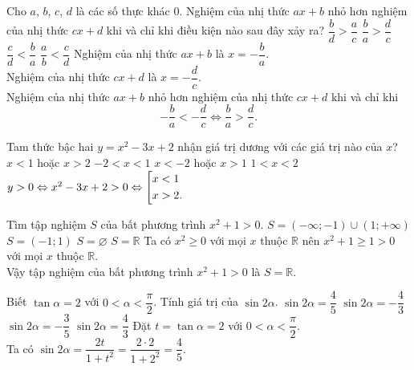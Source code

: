 \begin{ex}%
 Cho $a$, $b$, $c$, $d$ là các số thực khác $0$. Nghiệm của nhị thức $ax+b$ nhỏ hơn nghiệm của nhị thức $cx+d$ khi và chỉ khi điều kiện nào sau đây xảy ra?
 \choice
  {$\dfrac{b}{d} > \dfrac{a}{c}$}
  {\True $\dfrac{b}{a} > \dfrac{d}{c}$}
  {$\dfrac{c}{d} < \dfrac{b}{a}$}
  {$\dfrac{a}{b} < \dfrac{c}{d}$}
 \loigiai
 {
 Nghiệm của nhị thức $ax + b$ là $x = -\dfrac{b}{a}$.\\
 Nghiệm của nhị thức $cx + d$ là $x = -\dfrac{d}{c}$.\\
 Nghiệm của nhị thức $ax + b$ nhỏ hơn nghiệm của nhị thức $cx + d$ khi và chỉ khi
 $$-\dfrac{b}{a} < -\dfrac{d}{c} \Leftrightarrow \dfrac{b}{a} > \dfrac{d}{c}.$$
 }
\end{ex}


\begin{ex}%
 Tam thức bậc hai $y = x^2 - 3x + 2$ nhận giá trị dương với các giá trị nào của $x$?
 \choice
  {\True $x < 1$ hoặc $x > 2$}
  {$-2 < x < 1$}
  {$x < -2$ hoặc $x > 1$}
  {$1 < x <2$}
 \loigiai
 {
 $y > 0 \Leftrightarrow x^2 - 3x + 2 > 0 \Leftrightarrow \left[\begin{aligned}& x < 1 \\& x > 2.\end{aligned}\right.$
 }
\end{ex}


\begin{ex}%
 Tìm tập nghiệm $S$ của bất phương trình $x^2 + 1 > 0$.
 \choice
  {$S = (-\infty;-1) \cup (1;+\infty)$}
  {$S = (-1;1)$}
  {$S = \varnothing$}
  {\True $S = \mathbb{R}$}
 \loigiai
 {
 Ta có $x^2 \geq 0$ với mọi $x$ thuộc $\mathbb{R}$ nên $x^2 + 1 \geq 1 > 0$ với mọi $x$ thuộc $\mathbb{R}$.\\
 Vậy tập nghiệm của bất phương trình $x^2 + 1 > 0$ là $S = \mathbb{R}$.
 }
\end{ex}


\begin{ex}%
 Biết $\tan \alpha = 2$ với $0 < \alpha < \dfrac{\pi}{2}$. Tính giá trị của $\sin 2\alpha$.
 \choice
  {\True $\sin 2\alpha = \dfrac{4}{5}$}
  {$\sin 2\alpha = -\dfrac{4}{3}$}
  {$\sin 2\alpha = -\dfrac{3}{5}$}
  {$\sin 2\alpha = \dfrac{4}{3}$}
 \loigiai
 {
 Đặt $t = \tan \alpha = 2$ với $0 < \alpha < \dfrac{\pi}{2}$.\\
 Ta có $\sin 2 \alpha = \dfrac{2t}{1 + t^2} = \dfrac{2 \cdot 2}{1 + 2^2} = \dfrac{4}{5}$.
 }
\end{ex}



